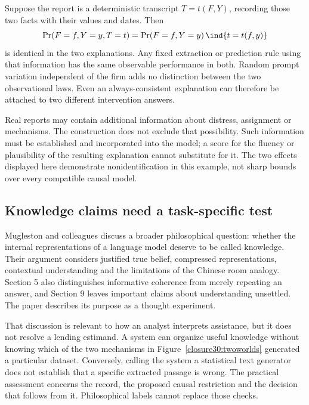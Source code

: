 Suppose the report is a deterministic transcript $T=t(F,Y)$, recording those
two facts with their values and dates. Then
\begin{equation}
 \Pr(F=f,Y=y,T=t)=\Pr(F=f,Y=y)\,\ind\{t=t(f,y)\}
\end{equation}
is identical in the two explanations. Any fixed extraction or prediction rule
using that information has the same observable performance in both. Random
prompt variation independent of the firm adds no distinction between the two
observational laws. Even an always-consistent explanation can therefore be
attached to two different intervention answers.

Real reports may contain additional information about distress, assignment
or mechanisms. The construction does not exclude that possibility. Such
information must be established and incorporated into the model; a score for
the fluency or plausibility of the resulting explanation cannot substitute
for it. The two effects displayed here demonstrate nonidentification in this
example, not sharp bounds over every compatible causal model.

\subsection{Knowledge claims need a task-specific test}

Mugleston and colleagues discuss a broader philosophical question: whether
the internal representations of a language model deserve to be called
knowledge. Their argument considers justified true belief, compressed
representations, contextual understanding and the limitations of the Chinese
room analogy. Section 5 also distinguishes informative coherence from merely
repeating an answer, and Section 9 leaves important claims about understanding
unsettled. The paper describes its purpose as a thought experiment.
\citep[Sections 3.3--6 and 9]{closure30mugleston}

That discussion is relevant to how an analyst interprets assistance, but it
does not resolve a lending estimand. A system can organize useful knowledge
without knowing which of the two mechanisms in Figure~\ref{closure30:twoworlds}
generated a particular dataset. Conversely, calling the system a statistical
text generator does not establish that a specific extracted passage is wrong.
The practical assessment concerns the record, the proposed causal restriction
and the decision that follows from it. Philosophical labels cannot replace
those checks.


